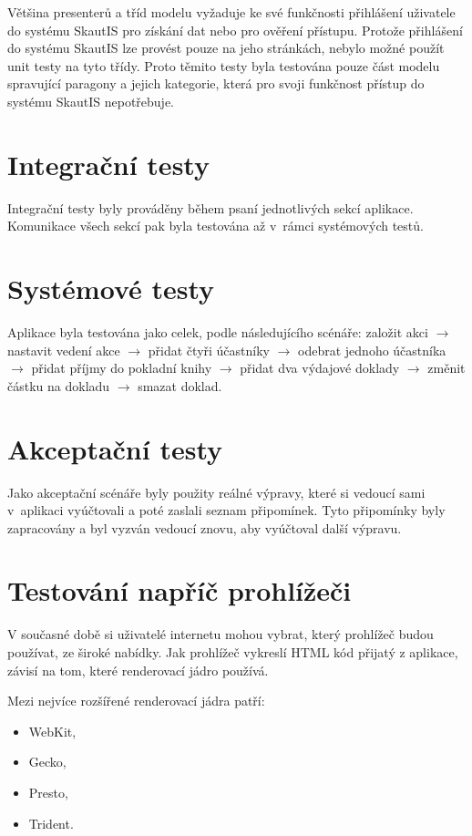 \documentclass[thesis=B,czech]{FITthesis}[2012/04/27]
\begin{document}
Většina presenterů a tříd modelu vyžaduje ke své funkčnosti přihlášení uživatele do systému SkautIS pro získání dat nebo pro ověření přístupu. Protože přihlášení do systému SkautIS lze provést pouze na jeho stránkách, nebylo možné použít unit testy na tyto třídy. Proto těmito testy byla testována pouze část modelu spravující paragony a jejich kategorie, která pro svoji funkčnost přístup do systému SkautIS nepotřebuje.

\section{Integrační testy}
Integrační testy byly prováděny během psaní jednotlivých sekcí aplikace. Komunikace všech sekcí pak byla testována až v~rámci systémových testů.

\section{Systémové testy}
Aplikace byla testována jako celek, podle následujícího scénáře: založit akci $\rightarrow$ nastavit vedení akce $\rightarrow$ přidat čtyři účastníky $\rightarrow$ odebrat jednoho účastníka $\rightarrow$ přidat příjmy do pokladní knihy $\rightarrow$ přidat dva výdajové doklady $\rightarrow$ změnit částku na dokladu $\rightarrow$ smazat doklad.

\section{Akceptační testy}
Jako akceptační scénáře byly použity reálné výpravy, které si vedoucí sami v~aplikaci vyúčtovali a poté zaslali seznam připomínek. Tyto připomínky byly zapracovány a byl vyzván vedoucí znovu, aby vyúčtoval další výpravu.    

\section{Testování napříč prohlížeči}
V současné době si uživatelé internetu mohou vybrat, který prohlížeč budou používat, ze široké nabídky. Jak prohlížeč vykreslí HTML kód přijatý z aplikace, závisí na tom, které renderovací jádro používá.

Mezi nejvíce rozšířené renderovací jádra patří:
\begin{itemize}
	\item WebKit,
	\item Gecko,
	\item Presto,
	\item Trident.
\end{itemize}
\end{document}
